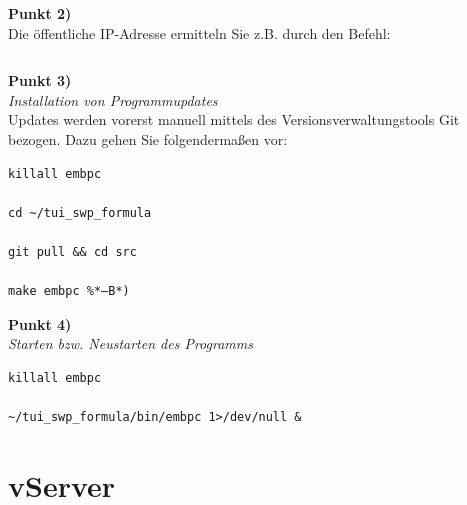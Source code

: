 \documentclass[fontsize = 12pt, paper = a4]{scrreprt}
\begin{document}
\vspace*{4mm}
\begin{lstlisting}[frame=single]
%*ssh root@192.168.0.2 –p22*)
\end{lstlisting} 
\vspace*{-2mm}

\textbf{Punkt 2)} \\

Die öffentliche IP-Adresse ermitteln Sie z.B. durch den Befehl:	

\vspace*{4mm}
\begin{lstlisting}[frame=single]
%*curl http://ip.skittel.de*)
\end{lstlisting} 
\vspace*{-2mm}

\newpage

\textbf{Punkt 3)} \\

\textit{Installation von Programmupdates} \\

Updates werden vorerst manuell mittels des Versionsverwaltungstools Git bezogen. Dazu gehen Sie folgendermaßen vor:

\vspace*{4mm}
\begin{lstlisting}[frame=single]
killall embpc

cd ~/tui_swp_formula

git pull && cd src

make embpc %*–B*)

\end{lstlisting} 
\vspace*{-2mm}

\textbf{Punkt 4)} \\

\textit{Starten bzw. Neustarten des Programms} 

\vspace*{4mm}
\begin{lstlisting}[frame=single]
killall embpc

~/tui_swp_formula/bin/embpc 1>/dev/null &
\end{lstlisting} 
\vspace*{-2mm}





\section{vServer}
\end{document}
